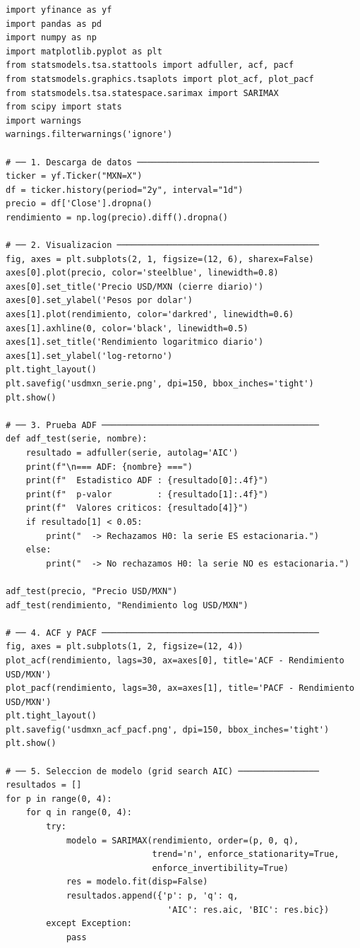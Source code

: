 \documentclass[12pt,a4paper]{article}
\begin{document}
\begin{lstlisting}[caption={Ejemplo 1: ARIMA para rendimientos USD/MXN},label=lst:usdmxn]
import yfinance as yf
import pandas as pd
import numpy as np
import matplotlib.pyplot as plt
from statsmodels.tsa.stattools import adfuller, acf, pacf
from statsmodels.graphics.tsaplots import plot_acf, plot_pacf
from statsmodels.tsa.statespace.sarimax import SARIMAX
from scipy import stats
import warnings
warnings.filterwarnings('ignore')

# ── 1. Descarga de datos ────────────────────────────────────
ticker = yf.Ticker("MXN=X")
df = ticker.history(period="2y", interval="1d")
precio = df['Close'].dropna()
rendimiento = np.log(precio).diff().dropna()

# ── 2. Visualizacion ────────────────────────────────────────
fig, axes = plt.subplots(2, 1, figsize=(12, 6), sharex=False)
axes[0].plot(precio, color='steelblue', linewidth=0.8)
axes[0].set_title('Precio USD/MXN (cierre diario)')
axes[0].set_ylabel('Pesos por dolar')
axes[1].plot(rendimiento, color='darkred', linewidth=0.6)
axes[1].axhline(0, color='black', linewidth=0.5)
axes[1].set_title('Rendimiento logaritmico diario')
axes[1].set_ylabel('log-retorno')
plt.tight_layout()
plt.savefig('usdmxn_serie.png', dpi=150, bbox_inches='tight')
plt.show()

# ── 3. Prueba ADF ───────────────────────────────────────────
def adf_test(serie, nombre):
    resultado = adfuller(serie, autolag='AIC')
    print(f"\n=== ADF: {nombre} ===")
    print(f"  Estadistico ADF : {resultado[0]:.4f}")
    print(f"  p-valor         : {resultado[1]:.4f}")
    print(f"  Valores criticos: {resultado[4]}")
    if resultado[1] < 0.05:
        print("  -> Rechazamos H0: la serie ES estacionaria.")
    else:
        print("  -> No rechazamos H0: la serie NO es estacionaria.")

adf_test(precio, "Precio USD/MXN")
adf_test(rendimiento, "Rendimiento log USD/MXN")

# ── 4. ACF y PACF ───────────────────────────────────────────
fig, axes = plt.subplots(1, 2, figsize=(12, 4))
plot_acf(rendimiento, lags=30, ax=axes[0], title='ACF - Rendimiento USD/MXN')
plot_pacf(rendimiento, lags=30, ax=axes[1], title='PACF - Rendimiento USD/MXN')
plt.tight_layout()
plt.savefig('usdmxn_acf_pacf.png', dpi=150, bbox_inches='tight')
plt.show()

# ── 5. Seleccion de modelo (grid search AIC) ────────────────
resultados = []
for p in range(0, 4):
    for q in range(0, 4):
        try:
            modelo = SARIMAX(rendimiento, order=(p, 0, q),
                             trend='n', enforce_stationarity=True,
                             enforce_invertibility=True)
            res = modelo.fit(disp=False)
            resultados.append({'p': p, 'q': q,
                                'AIC': res.aic, 'BIC': res.bic})
        except Exception:
            pass


\end{lstlisting}
\end{document}
